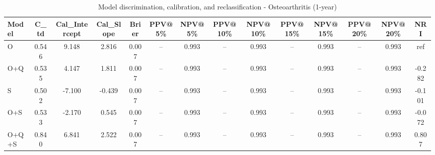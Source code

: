 \begin{table}[htbp]
\centering
\small
\caption{Model discrimination, calibration, and reclassification - Osteoarthritis (1-year)}
\label{tab:perf_osteoarthritis_1y}
\begin{tabular}{lccccccccccccc}
\toprule
Model & C\_td & Cal\_Intercept & Cal\_Slope & Brier & PPV@5\% & NPV@5\% & PPV@10\% & NPV@10\% & PPV@15\% & NPV@15\% & PPV@20\% & NPV@20\% & NRI \\
\midrule
O & 0.546 & 9.148 & 2.816 & 0.007 & -- & 0.993 & -- & 0.993 & -- & 0.993 & -- & 0.993 & ref \\
O+Q & 0.535 & 4.147 & 1.811 & 0.007 & -- & 0.993 & -- & 0.993 & -- & 0.993 & -- & 0.993 & -0.282 \\
S & 0.502 & -7.100 & -0.439 & 0.007 & -- & 0.993 & -- & 0.993 & -- & 0.993 & -- & 0.993 & -0.101 \\
O+S & 0.533 & -2.170 & 0.545 & 0.007 & -- & 0.993 & -- & 0.993 & -- & 0.993 & -- & 0.993 & -0.072 \\
O+Q+S & 0.840 & 6.841 & 2.522 & 0.007 & -- & 0.993 & -- & 0.993 & -- & 0.993 & -- & 0.993 & 0.807 \\
\bottomrule
\end{tabular}
\end{table}
